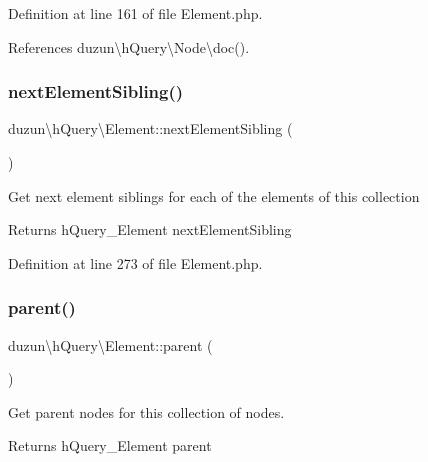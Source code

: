 Definition at line 161 of file Element.\+php.



References duzun\textbackslash{}h\+Query\textbackslash{}\+Node\textbackslash{}doc().

\mbox{\label{classduzun_1_1hQuery_1_1Element_aae1431b6dd85e2289ce1b86ba9c9b4c5}} 
\subsubsection{\texorpdfstring{next\+Element\+Sibling()}{nextElementSibling()}}
{\footnotesize\ttfamily duzun\textbackslash{}h\+Query\textbackslash{}\+Element\+::next\+Element\+Sibling (\begin{DoxyParamCaption}{ }\end{DoxyParamCaption})}

Get next element siblings for each of the elements of this collection

\begin{DoxyReturn}{Returns}
h\+Query\+\_\+\+Element next\+Element\+Sibling 
\end{DoxyReturn}


Definition at line 273 of file Element.\+php.

\mbox{\label{classduzun_1_1hQuery_1_1Element_a7a475b43ddf3e33b0d4fbc419d70369a}} 
\subsubsection{\texorpdfstring{parent()}{parent()}}
{\footnotesize\ttfamily duzun\textbackslash{}h\+Query\textbackslash{}\+Element\+::parent (\begin{DoxyParamCaption}{ }\end{DoxyParamCaption})}

Get parent nodes for this collection of nodes.

\begin{DoxyReturn}{Returns}
h\+Query\+\_\+\+Element parent 
\end{DoxyReturn}


